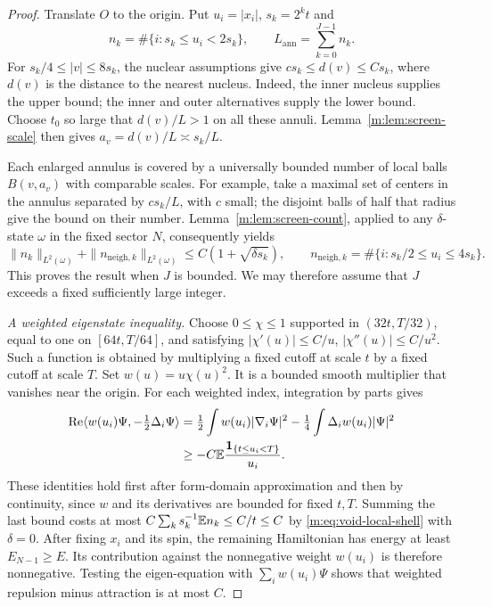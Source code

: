 \begin{proof}
Translate $O$ to the origin.  Put $u_i=|x_i|$, $s_k=2^kt$ and
\[
 n_k=\#\{i:s_k\le u_i<2s_k\},\qquad
 L_{\mathrm{ann}}=\sum_{k=0}^{J-1}n_k.
\]
For $s_k/4\le |v|\le8s_k$, the nuclear assumptions give
$c s_k\le d(v)\le C s_k$, where $d(v)$ is the distance to the nearest
nucleus.  Indeed, the inner nucleus supplies the upper bound; the inner
and outer alternatives supply the lower bound.  Choose $t_0$ so large
that $d(v)/L>1$ on all these annuli.  Lemma~\ref{m:lem:screen-scale} then
gives $a_v=d(v)/L\asymp s_k/L$.

Each enlarged annulus is covered by a universally bounded number of
local balls $B(v,a_v)$ with comparable scales.  For example, take a
maximal set of centers in the annulus separated by $c s_k/L$, with $c$
small; the disjoint balls of half that radius give the bound on their
number.  Lemma~\ref{m:lem:screen-count}, applied to any $\delta$-state
$\omega$ in the fixed sector $N$, consequently yields
\begin{equation}\label{m:eq:void-local-shell}
 \|n_k\|_{L^2(\omega)}
 +\|n_{\mathrm{neigh},k}\|_{L^2(\omega)}
 \le C(1+\sqrt{\delta s_k}),
 \qquad
 n_{\mathrm{neigh},k}=\#\{i:s_k/2\le u_i\le4s_k\}.
\end{equation}
This proves the result when $J$ is bounded.  We may therefore assume that
$J$ exceeds a fixed sufficiently large integer.

\medskip\noindent
\emph{A weighted eigenstate inequality.}
Choose $0\le\chi\le1$ supported in $(32t,T/32)$, equal to one on
$[64t,T/64]$, and satisfying
$|\chi'(u)|\le C/u$, $|\chi''(u)|\le C/u^2$.
Such a function is obtained by multiplying a fixed cutoff at scale $t$
by a fixed cutoff at scale $T$.  Set $w(u)=u\chi(u)^2$.
It is a bounded smooth multiplier that vanishes near the origin.
For each weighted index, integration by parts gives
\begin{align*}
 \operatorname{Re}\langle w(u_i)\Psi,-\tfrac12\Delta_i\Psi\rangle
 &=\tfrac12\int w(u_i)|\nabla_i\Psi|^2
   -\tfrac14\int \Delta_iw(u_i)|\Psi|^2\\
 &\ge-C\mathbb E\frac{\mathbf 1_{\{t\le u_i<T\}}}{u_i}.
\end{align*}
These identities hold first after form-domain approximation and then
by continuity, since $w$ and its derivatives are bounded for fixed
$t,T$.  Summing the last bound costs at most
$C\sum_k s_k^{-1}\mathbb E n_k\le C/t\le C$ by
\eqref{m:eq:void-local-shell} with $\delta=0$.
After fixing $x_i$ and its spin, the remaining Hamiltonian has energy at
least $E_{N-1}\ge E$.  Its contribution against the nonnegative weight
$w(u_i)$ is therefore nonnegative.  Testing the eigen-equation with
$\sum_iw(u_i)\Psi$ shows that weighted repulsion minus attraction is at
most $C$.


\end{proof}
